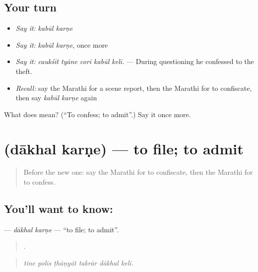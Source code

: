 \subsection*{Your turn}
\begin{itemize}
\raggedright
  \item \emph{Say it:} \emph{kabūl karṇe}
  \item \emph{Say it:} \emph{kabūl karṇe}, once more
  \item \emph{Say it:} \emph{caukśīt tyāne corī kabūl kelī.} — During questioning he confessed to the theft.
  \item \emph{Recall:} say the Marathi for a scene report, then the Marathi for to confiscate, then say \emph{kabūl karṇe} again
\end{itemize}

\begin{tcolorbox}[breakable,colback=teal!4,colframe=teal!35!black,title={Before you move on}]
What does   mean? (\textquotedblleft{}To confess; to admit\textquotedblright{}.) Say it once more.
\end{tcolorbox}
\section[\texorpdfstring{\mr{दाखल} \mr{करणे} (dākhal karṇe)}{दाखल करणे (dākhal karṇe)}]{  (dākhal karṇe) — to file; to admit}

\label{lesson:MR-C299-dakhal-karne}



\begin{quote}
Before the new one: say the Marathi for to confiscate, then the Marathi for to confess.
\end{quote}

\subsection*{You'll want to know:  }
\textbf{ } — \emph{dākhal karṇe} — \textquotedblleft{}to file; to admit\textquotedblright{}.

\begin{quote}
     .
\end{quote}

\begin{quote}
\emph{tine polīs ṭhāṇyāt takrār dākhal kelī.}
\end{quote}

